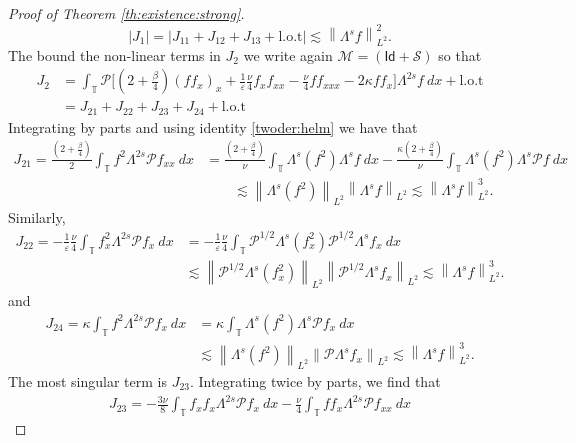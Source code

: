 \documentclass[reqno]{amsart}
\newcommand{\TT}{\mathbb T}
\newcommand{\norm}[1]{\left\lVert#1\right\rVert}
\newcommand\abs[1]{\left|#1\right|}
\theoremstyle{definition}
\numberwithin{equation}{section}
\numberwithin{theorem}{section}
\numberwithin{definition}{section}
\begin{document}
\begin{proof}[Proof of Theorem \ref{th:existence:strong}]
\begin{equation}\label{estimate:J1}
\abs{J_{1}}=\abs{J_{11}+J_{12}+J_{13}+ \mbox{l.o.t}} \lesssim \norm{\Lambda^{s}f}_{L^{2}}^{2}.
\end{equation}
The bound the non-linear terms in $J_{2}$ we write again $\mathcal{M}=(\mathsf{Id}+\mathcal{S})$ so that
\begin{align*}
J_{2}&=\int_{\TT}\mathcal{P}\bigg[\left(2+\frac{\beta}{4}\right)(f f_{x})_{x} + \frac{1}{\varepsilon}\frac{\nu}{4}f_{x}f_{xx}  -\frac{\nu}{4}ff_{xxx}-2\kappa ff_{x}\bigg] \Lambda^{2s} f \ dx+ \mbox{l.o.t} \\
&= J_{21}+J_{22}+J_{23}+J_{24}+ \mbox{l.o.t}
\end{align*}
Integrating by parts and using identity \eqref{twoder:helm} we have that
\begin{align*}
 J_{21}=\frac{\left(2+\frac{\beta}{4}\right)}{2}  \int_{\TT } f^{2} \Lambda^{2s} \mathcal{P} f_{xx} \ dx&= \frac{\left(2+\frac{\beta}{4}\right)}{\nu} \int_{\TT }   \Lambda^{s}(f^{2}) \Lambda^{s}f \ dx - \frac{\kappa\left(2+\frac{\beta}{4}\right)}{\nu}  \int_{\TT }\Lambda^{s}(f^{2}) \Lambda^{s}\mathcal{P}f \ dx \\
 & \quad \quad \lesssim \norm{\Lambda^{s}(f^{2})}_{L^{2}}\norm{\Lambda^{s}f}_{L^{2}}\lesssim \norm{\Lambda^{s}f}_{L^{2}}^{3}.
\end{align*}
Similarly,
\begin{align*}
 J_{22}=-\frac{1}{\varepsilon}\frac{\nu}{4} \int_{\TT } f_{x}^{2} \Lambda^{2s} \mathcal{P} f_{x} \ dx&= -\frac{1}{\varepsilon}\frac{\nu}{4}\int_{\TT }   \mathcal{P}^{1/2}\Lambda^{s}(f_{x}^{2}) \mathcal{P}^{1/2} \Lambda^{s}f_{x} \ dx \\
  & \lesssim \norm{\mathcal{P}^{1/2}\Lambda^{s}(f_{x}^{2})}_{L^{2}}\norm{\mathcal{P}^{1/2}\Lambda^{s}f_{x}}_{L^{2}}\lesssim \norm{\Lambda^{s}f}_{L^{2}}^{3}.
\end{align*}
and
\begin{align*}
 J_{24}=\kappa \int_{\TT } f^{2} \Lambda^{2s} \mathcal{P} f_{x} \ dx&=\kappa \int_{\TT } \Lambda^{s} (f^{2}) \Lambda^{s} \mathcal{P} f_{x} \ dx \\
  & \lesssim \norm{\Lambda^{s}(f^{2})}_{L^{2}}\norm{\mathcal{P}\Lambda^{s}f_{x}}_{L^{2}}\lesssim \norm{\Lambda^{s}f}_{L^{2}}^{3}.
\end{align*}
The most singular term is $J_{23}$. Integrating twice by parts, we find that
\begin{align*}
J_{23}=-\frac{3\nu}{8}\int_{\TT} f_{x}f_{x} \Lambda^{2s}\mathcal{P}f_{x}\ dx- \frac{\nu}{4}\int_{\TT} ff_{x} \Lambda^{2s}\mathcal{P}f_{xx} \ dx

\end{align*}
\end{proof}
\end{document}
